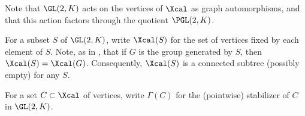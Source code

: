  Note that $\GL(2,K)$ acts on the vertices of $\Xcal$ as graph automorphisms, and that this action factors through the quotient $\PGL(2,K)$.

 For a subset $S$ of $\GL(2,K)$, write $\Xcal(S)$ for the set of vertices fixed by each element of $S$. Note, as in \cite[Sec. 3.1]{bellaicheSousgroupesGLArbres2014}, that if $G$ is the group generated by $S$, then $\Xcal(S) = \Xcal(G)$. Consequently, $\Xcal(S)$ is a connected subtree (possibly empty) for any $S$.

 For  a set $C\subset \Xcal$ of vertices, write $\Gamma(C)$ for the (pointwise) stabilizer of $C$ in $\GL(2,K)$.






